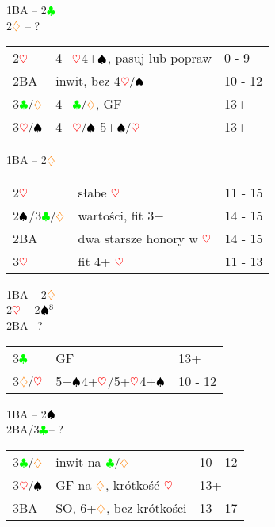 \documentclass[a4paper,11pt]{article}
\newcommand{\CC}{\textcolor{green}\clubsuit}
\newcommand{\DD}{\textcolor{orange}\diamondsuit}
\newcommand{\HH}{\textcolor{red}\heartsuit}
\newcommand{\PP}{\textcolor{black}\spadesuit}
\begin{document}
\newpage



\begin{center}\LARGE{1BA -- 2$\CC$\\2$\DD$ -- ?}\\
\end{center}
\begin{tabular}{p{2cm} p{10cm} l}
	2$\HH$ & 4+$\HH$4+$\PP$, pasuj lub popraw & 0 - 9\\
	2BA & inwit, bez 4$\HH/\PP$ & 10 - 12\\
	3$\CC/\DD$ & 4+$\CC/\DD$, GF & 13+\\
	3$\HH/\PP$\footnotemark[7] & 4+$\HH/\PP$ 5+$\PP/\HH$ & 13+\\

\end{tabular}


\begin{center}\LARGE{1BA -- 2$\DD$}\\
\end{center}
\begin{tabular}{p{2cm} p{10cm} l}
	2$\HH$ & słabe $\HH$ & 11 - 15\\
	2$\PP$/3$\CC/\DD$ & wartości, fit 3+ & 14 - 15\\
	2BA & dwa starsze honory w $\HH$ & 14 - 15\\
	3$\HH$ & fit 4+ $\HH$ & 11 - 13\\
\end{tabular}

\begin{center}\LARGE{1BA -- 2$\DD$\\2$\HH$ -- 2$\PP\footnotemark[8]$\\2BA\footnotemark[8]-- ?}\\
\end{center}
\begin{tabular}{p{2cm} p{10cm} l}
	3$\CC$ & GF & 13+\\
	3$\DD/\HH$ &  5+$\PP$4+$\HH$/5+$\HH$4+$\PP$& 10 - 12\\
\end{tabular}

\footnotetext[8]{54$\HH\PP$ i pytanie}
\newpage

\begin{center}\LARGE{1BA -- 2$\PP$\\2BA/3$\CC$\footnotemark[1] -- ?}\\
\end{center}
\begin{tabular}{p{2cm} p{10cm} l}
	3$\CC/\DD$ & inwit na $\CC/\DD$ & 10 - 12\\
	3$\HH/\PP$ & GF na $\DD$, krótkość $\HH$ & 13+\\
	3BA & SO, 6+$\DD$, bez krótkości & 13 - 17\\
\end{tabular}
\end{document}
